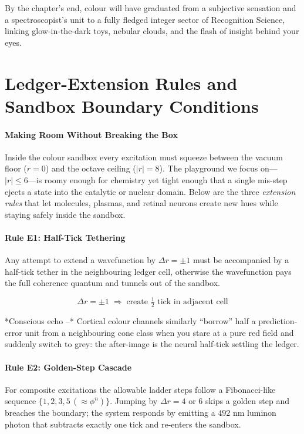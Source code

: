 \documentclass[11pt,oneside]{book}
\begin{document}
{By the chapter’s end, colour will have graduated from a subjective
sensation and a spectroscopist’s unit to a fully fledged integer sector
of Recognition Science, linking glow-in-the-dark toys, nebular clouds,
and the flash of insight behind your eyes.

\bigskip

\section{Ledger-Extension Rules and Sandbox Boundary Conditions}
\label{sec:sandbox-rules}

\paragraph*{Making Room Without Breaking the Box}

Inside the colour sandbox every excitation must squeeze between the
vacuum floor ($r=0$) and the octave ceiling ($|r|=8$).  The playground
we focus on—\(|r|\!\le\!6\)—is roomy enough for chemistry yet tight
enough that a single mis-step ejects a state into the catalytic or
nuclear domain.  
Below are the three \emph{extension rules} that let molecules, plasmas,
and retinal neurons create new hues while staying safely inside the
sandbox.

\paragraph*{Rule E1: Half-Tick Tethering}

Any attempt to extend a wavefunction by $\Delta r=\pm1$ must be
accompanied by a half-tick tether in the neighbouring ledger cell,
otherwise the wavefunction pays the full coherence quantum and tunnels
out of the sandbox.

\[
   \boxed{\;
     \Delta r = \pm1 \;\Longrightarrow\;
     \text{create } \tfrac12 \text{ tick in adjacent cell}
   \;}
\]

*Conscious echo –*  Cortical colour channels similarly “borrow”  half a
prediction-error unit from a neighbouring cone class when you stare at a
pure red field and suddenly switch to grey: the after-image is the
neural half-tick settling the ledger.

\paragraph*{Rule E2: Golden-Step Cascade}

For composite excitations the allowable ladder steps follow a Fibonacci-like
sequence  
\(\{1,2,3,5\,(\!\approx\phi^{n})\}\).  
Jumping by \(\Delta r=4\) or \(6\) skips a golden step and breaches the
boundary; the system responds by emitting a $492$ nm luminon photon that
subtracts exactly one tick and re-enters the sandbox.

}
\end{document}
